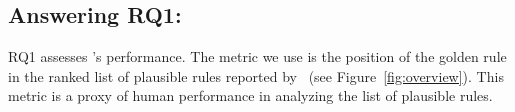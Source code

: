 \documentclass[conference]{IEEEtran}
\begin{document}

\subsection{Answering RQ1: \textRQone}
\label{sec:answer-rqone}

RQ1 assesses \tname's performance. The metric we use is the position
of the golden rule in the ranked list of plausible rules reported by
\tname\ (see Figure~\ref{fig:overview}). This metric is a proxy of
human performance in analyzing the list of plausible rules.
\end{document}
